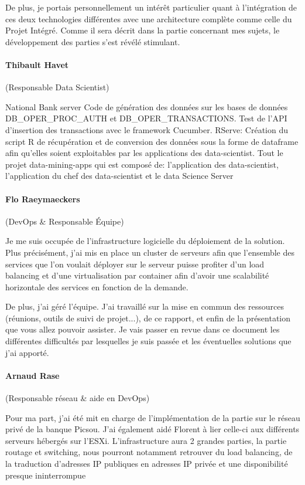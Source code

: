 De plus, je portais personnellement un intérêt particulier quant à l'intégration de ces deux technologies différentes avec une architecture complète comme celle du Projet Intégré. Comme il sera décrit dans la partie concernant mes sujets, le développement des parties s'est révélé stimulant. 

\paragraph{Thibault Havet} (Responsable Data Scientist)

National Bank server
Code de génération des données sur les bases de données \\ DB\_OPER\_PROC\_AUTH et DB\_OPER\_TRANSACTIONS.
Test de l'API d'insertion des transactions avec le framework Cucumber.
RServe:
  Création du script R de récupération et de conversion des données sous la forme de dataframe afin qu'elles soient   exploitables par les applications des data-scientist.
Tout le projet data-mining-apps qui est composé de:
  l'application des data-scientist, l'application du chef des data-scientist et le data Science Server


\paragraph{Flo Raeymaeckers} (DevOps \& Responsable Équipe)

Je me suis occupée de l'infrastructure logicielle du déploiement de la solution. Plus précisément, j'ai mis en place un cluster de serveurs afin que l'ensemble des services que l'on voulait déployer sur le serveur puisse profiter d'un load balancing et d'une virtualisation par container afin d'avoir une scalabilité horizontale des services en fonction de la demande.

De plus, j'ai géré l'équipe. J'ai travaillé sur la mise en commun des ressources (réunions, outils de suivi de projet...), de ce rapport, et enfin de la présentation que vous allez pouvoir assister. Je vais passer en revue dans ce document les différentes difficultés par lesquelles je suis passée et les éventuelles solutions que j'ai apporté.

\paragraph{Arnaud Rase} (Responsable réseau \& aide en DevOps)

Pour ma part, j'ai été mit en charge de l'implémentation de la partie sur le réseau privé de la
banque Picsou. J'ai également aidé Florent à lier celle-ci aux différents serveurs hébergés sur
l'ESXi. L'infrastructure aura 2 grandes parties, la partie routage et switching, nous pourront
notamment retrouver du load balancing, de la traduction d'adresses IP publiques en adresses
IP privée et une disponibilité presque ininterrompue

